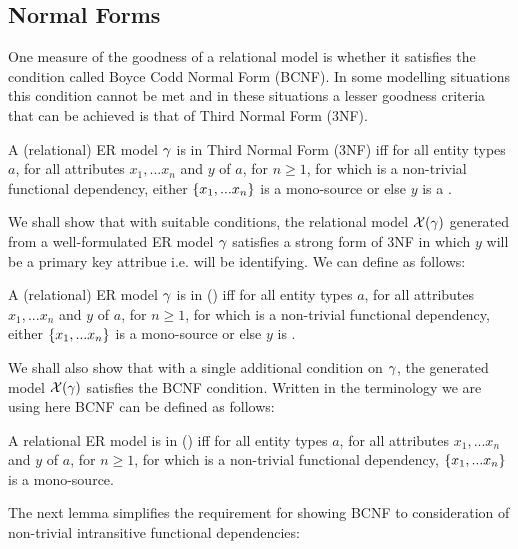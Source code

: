 \subsection{Normal Forms}

\noindent One measure of the goodness of a relational model is whether it satisfies the condition called Boyce Codd Normal Form (BCNF). In some modelling situations this condition cannot be 
met and in these situations a lesser goodness criteria that can be achieved is that of Third Normal Form (3NF). 

\begin{definition} %
A (relational) ER model $\gamma$ is in  Third Normal Form (3NF)  iff
for all entity types $a$, for all attributes $x_1,...x_n$ and $y$ of $a$, for $n \geq 1$, 
for which   is a non-trivial functional dependency, 
either $\left\{x_1,...x_n\right\}$ is a mono-source or else $y$ is a .
\end{definition}


We shall show that with suitable conditions, the relational model $\mathcal{X}(\gamma)$ generated from a well-formulated 
ER model $\gamma$ satisfies a strong form of 3NF in which $y$ will be a primary key attribue i.e. will be identifying.
We can define as follows:

\begin{definition} %
A (relational) ER model $\gamma$ is in  ()  iff
for all entity types $a$, for all attributes $x_1,...x_n$ and $y$ of $a$, for $n \geq 1$, 
for which   is a non-trivial functional dependency, 
either $\left\{x_1,...x_n\right\}$ is a mono-source or else $y$ is .
\end{definition}

We shall also show that with a single additional condition on $\gamma$, 
the generated model $\mathcal{X}(\gamma)$ satisfies the BCNF condition.
Written in the terminology we are using here BCNF can be defined as follows:
\begin{definition} %
A relational ER model is in  ()  iff
for all entity types $a$, for all attributes $x_1,...x_n$ and $y$ of $a$, for $n \geq 1$, 
for which   is a non-trivial functional dependency, 
$\left\{x_1,...x_n\right\}$ is a mono-source.  
\end{definition}

\noindent The next lemma simplifies the requirement for showing BCNF to consideration of non-trivial
intransitive functional dependencies:

